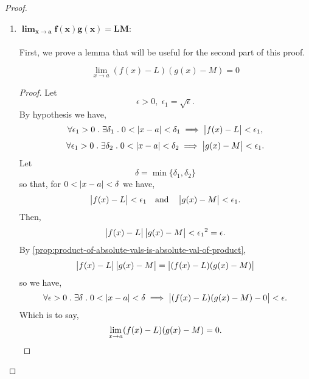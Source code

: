 \documentclass[../MathsNotesBase.tex]{subfiles}
\begin{document}
{\begin{proof}
\begin{enumerate}[label=(\roman*)]
{					Arguing similarly to (iii), again, for $x$ in the $\delta$-neighbourhood of $a$, we have both
					\[ \abs{f(x) - L} < \epsilon_1 \eqand \abs{g(x) - M} < \epsilon_1. \]
					This time, we are going to subtract the two expressions and use a fact derived from the absolute value properties (see: \ref{ssection:absolute-value}) that,
					\[ \abs{\abs{x} - \abs{y}} \leq \abs{x - y} \leq \abs{x} + \abs{y}. \]
					\begin{align*}
					&& \abs{(f(x) - L) - (g(x) - M)} &\leq \abs{f(x) - L} + \abs{g(x) - M} < 2\epsilon_1 \\
					&\iff & \abs{(f(x) - L) - (g(x) - M)} &<  2\epsilon_1 = \epsilon &\sidecomment{}\\
					&\iff & \abs{(f(x) - g(x)) - (L - M)} &<  \epsilon. &\sidecomment{}
					\end{align*}
					\bigskip
				}
				\item{${\bm{ \lim_{x \to a} f(x)g(x) = LM }}$:\\\\
					First, we prove a lemma that will be useful for the second part of this proof.
					\begin{lemma}
						\[ \lim_{x \to a} (f(x) - L)(g(x) - M) = 0 \]
					\end{lemma}
					\begin{proof}
						Let 
						\[ \epsilon > 0,\; \epsilon_1 = \sqrt{\epsilon}.\]
						By hypothesis we have,
						\[ \forall \epsilon_1 > 0 \;.\; \exists \delta_1 \;.\; 0 < \left\lvert x - a\right\rvert < \delta_1 \implies \left\lvert f(x) - L\right\rvert < \epsilon_1, \]
						\[ \forall \epsilon_1 > 0 \;.\; \exists \delta_2 \;.\; 0 < \left\lvert x - a\right\rvert < \delta_2 \implies \left\lvert g(x) - M\right\rvert < \epsilon_1. \]
						Let 
						\[ \delta = \min \{\delta_1,\delta_2\} \]
						so that, for ${ 0 < \left\lvert x - a\right\rvert < \delta }$ we have,
						\[  \abs{f(x) - L} < \epsilon_1 \eqand \abs{g(x) - M} < \epsilon_1. \]
						Then,
						\[ \left\lvert f(x) - L\right\rvert\left\lvert g(x) - M\right\rvert < {\epsilon_1}^2 = \epsilon. \]
						By \autoref{prop:product-of-absolute-vals-is-absolute-val-of-product},
						\[ \left\lvert f(x) - L\right\rvert\left\lvert g(x) - M\right\rvert = \left\lvert(f(x) - L)(g(x) - M)\right\rvert \]
						so we have,
						\[ \forall \epsilon > 0 \;.\; \exists \delta \;.\; 0 < \left\lvert x - a\right\rvert < \delta \implies \left\lvert(f(x) - L)(g(x) - M) - 0\right\rvert < \epsilon. \]
						Which is to say,
						\[ \lim_{x \to a} (f(x) - L)(g(x) - M) = 0. \qedhere \]
					\end{proof}
}
\end{enumerate}
\end{proof}}
\end{document}
